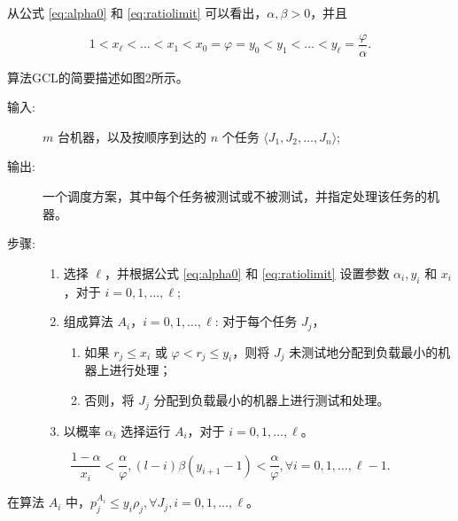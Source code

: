 从公式 \ref{eq:alpha0} 和 \ref{eq:ratiolimit} 可以看出，\( \alpha, \beta > 0 \)，并且

\begin{equation}
    1 < x_\ell < \ldots < x_1 < x_0
    = \varphi = y_0 < y_1 < \ldots < y_\ell = \frac{\varphi}{\alpha}.
\end{equation}

算法GCL的简要描述如图2所示。

\begin{Thmbox}
    \begin{description}
        \item[输入:] \( m \) 台机器，以及按顺序到达的 \( n \) 个任务 \( \langle J_1, J_2, \ldots, J_n \rangle \);
        \item[输出:] 一个调度方案，其中每个任务被测试或不被测试，并指定处理该任务的机器。
        \item[步骤:]
        \begin{enumerate}
          \item 选择 \( \ell \)，并根据公式 \ref{eq:alpha0} 和 \ref{eq:ratiolimit} 设置参数 \( \alpha_i, y_i \) 和 \( x_i \)，对于 \( i = 0, 1, \ldots, \ell \);
          \item 组成算法 \( A_i \)，\( i = 0, 1, \ldots, \ell \): 对于每个任务 \( J_j \)，
            \begin{enumerate}
              \item 如果 \( r_j \leq x_i \) 或 \( \varphi < r_j \leq y_i \)，则将 \( J_j \) 未测试地分配到负载最小的机器上进行处理；
              \item 否则，将 \( J_j \) 分配到负载最小的机器上进行测试和处理。
            \end{enumerate}
          \item 以概率 \( \alpha_i \) 选择运行 \( A_i \)，对于 \( i = 0, 1, \ldots, \ell \)。
        \end{enumerate}
      \end{description}
\end{Thmbox}

\begin{lem}
\[
    \frac{1-\alpha}{x_i} < \frac{\alpha}{\varphi},
    (l-i)\beta(y_{i+1}-1) < \frac{\alpha}{\varphi},
    \forall i=0,1,\dots,\ell-1.
\]
\end{lem}

\begin{lem}
在算法 \( A_i \) 中，\( p_j^{A_i}\leq y_i\rho_j, \forall J_j, i=0,1,\dots,\ell \)。
\end{lem}

